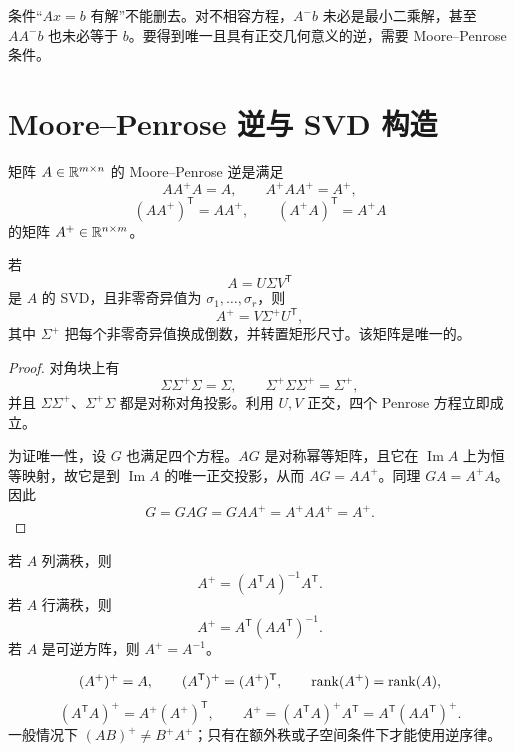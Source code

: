 \begin{remark}
条件“$Ax=b$ 有解”不能删去。对不相容方程，$A^{-}b$ 未必是最小二乘解，甚至 $AA^{-}b$ 也未必等于 $b$。要得到唯一且具有正交几何意义的逆，需要 Moore--Penrose 条件。
\end{remark}

\section{Moore--Penrose 逆与 SVD 构造}

\begin{definition}
矩阵 $A\in\mathbb{R}^{m\times n}$ 的 Moore--Penrose 逆是满足
\[
AA^+A=A,
\qquad
A^+AA^+=A^+,
\]
\[
(AA^+)^{\mathsf T}=AA^+,
\qquad
(A^+A)^{\mathsf T}=A^+A
\]
的矩阵 $A^+\in\mathbb{R}^{n\times m}$。
\end{definition}

\begin{theorem}
若
\[
A=U\Sigma V^{\mathsf T}
\]
是 $A$ 的 SVD，且非零奇异值为
$\sigma_1,\ldots,\sigma_r$，则
\[
A^+=V\Sigma^+U^{\mathsf T},
\]
其中 $\Sigma^+$ 把每个非零奇异值换成倒数，并转置矩形尺寸。该矩阵是唯一的。
\end{theorem}
\begin{proof}
对角块上有
\[
\Sigma\Sigma^+\Sigma=\Sigma,
\qquad
\Sigma^+\Sigma\Sigma^+=\Sigma^+,
\]
并且 $\Sigma\Sigma^+$、$\Sigma^+\Sigma$ 都是对称对角投影。利用 $U,V$ 正交，四个 Penrose 方程立即成立。

为证唯一性，设 $G$ 也满足四个方程。$AG$ 是对称幂等矩阵，且它在 $\operatorname{Im}A$ 上为恒等映射，故它是到 $\operatorname{Im}A$ 的唯一正交投影，从而
$AG=AA^+$。同理 $GA=A^+A$。因此
\[
G=GAG=GAA^+=A^+AA^+=A^+.
\]
\end{proof}

\begin{corollary}[满秩情形]
若 $A$ 列满秩，则
\[
A^+=(A^{\mathsf T}A)^{-1}A^{\mathsf T}.
\]
若 $A$ 行满秩，则
\[
A^+=A^{\mathsf T}(AA^{\mathsf T})^{-1}.
\]
若 $A$ 是可逆方阵，则 $A^+=A^{-1}$。
\end{corollary}

\begin{proposition}[伪逆的基本性质]
\[
(A^+)^+=A,
\qquad
(A^{\mathsf T})^+=(A^+)^{\mathsf T},
\qquad
\operatorname{rank}(A^+)=\operatorname{rank}(A),
\]
\[
(A^{\mathsf T}A)^+=A^+(A^+)^{\mathsf T},
\qquad
A^+=(A^{\mathsf T}A)^+A^{\mathsf T}
=A^{\mathsf T}(AA^{\mathsf T})^+.
\]
一般情况下 $(AB)^+\ne B^+A^+$；只有在额外秩或子空间条件下才能使用逆序律。
\end{proposition}

